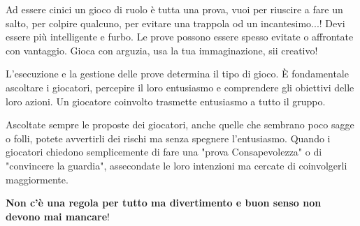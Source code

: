 \begin{multicols}{2}
\begin{changemargin}{0.3cm}{0.3cm}\begin{tcolorbox}[title = Prove Prove e Prove!]
Ad essere cinici un gioco di ruolo è tutta una prova, vuoi per riuscire a fare un salto, per colpire qualcuno, per evitare una trappola od un incantesimo...!
Devi essere più intelligente e furbo. Le prove possono essere spesso evitate o affrontate con vantaggio. Gioca con arguzia, usa la tua immaginazione, sii creativo!
\end{tcolorbox}\end{changemargin}

%


\begin{changemargin}{0.3cm}{0.3cm}\begin{narratore}
L'esecuzione e la gestione delle prove determina il tipo di gioco. È fondamentale ascoltare i giocatori, percepire il loro entusiasmo e comprendere gli obiettivi delle loro azioni. Un giocatore coinvolto trasmette entusiasmo a tutto il gruppo.

Ascoltate sempre le proposte dei giocatori, anche quelle che sembrano poco sagge o folli, potete avvertirli dei rischi ma senza spegnere l'entusiasmo. Quando i giocatori chiedono semplicemente di fare una "prova Consapevolezza" o di "convincere la guardia", assecondate le loro intenzioni ma cercate di coinvolgerli maggiormente.

\textbf{Non c'è una regola per tutto ma divertimento e buon senso non devono mai mancare}!
\end{narratore}\end{changemargin}

\end{multicols}

\pagebreak

